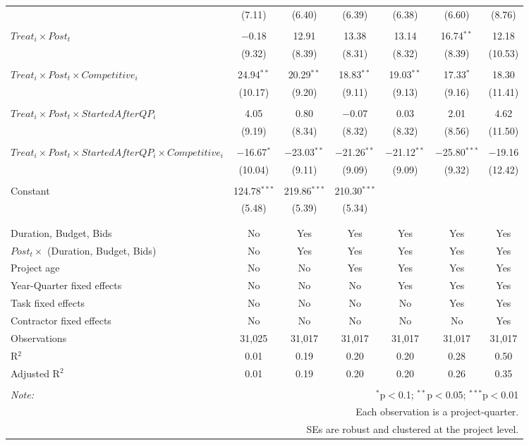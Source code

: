 \documentclass[
]{article}
\begin{document}
\begin{table}[H]
\begin{tabular}{@{\extracolsep{-3pt}}lcccccc}
  & (7.11) & (6.40) & (6.39) & (6.38) & (6.60) & (8.76) \\ 
  & & & & & & \\ 
 $Treat_i \times Post_t$ & $-$0.18 & 12.91 & 13.38 & 13.14 & 16.74$^{**}$ & 12.18 \\ 
  & (9.32) & (8.39) & (8.31) & (8.32) & (8.39) & (10.53) \\ 
  & & & & & & \\ 
 $Treat_i \times Post_t \times Competitive_i$ & 24.94$^{**}$ & 20.29$^{**}$ & 18.83$^{**}$ & 19.03$^{**}$ & 17.33$^{*}$ & 18.30 \\ 
  & (10.17) & (9.20) & (9.11) & (9.13) & (9.16) & (11.41) \\ 
  & & & & & & \\ 
 $Treat_i \times Post_t \times StartedAfterQP_i$ & 4.05 & 0.80 & $-$0.07 & 0.03 & 2.01 & 4.62 \\ 
  & (9.19) & (8.34) & (8.32) & (8.32) & (8.56) & (11.50) \\ 
  & & & & & & \\ 
 $Treat_i \times Post_t \times StartedAfterQP_i \times Competitive_i$ & $-$16.67$^{*}$ & $-$23.03$^{**}$ & $-$21.26$^{**}$ & $-$21.12$^{**}$ & $-$25.80$^{***}$ & $-$19.16 \\ 
  & (10.04) & (9.11) & (9.09) & (9.09) & (9.32) & (12.42) \\ 
  & & & & & & \\ 
 Constant & 124.78$^{***}$ & 219.86$^{***}$ & 210.30$^{***}$ &  &  &  \\ 
  & (5.48) & (5.39) & (5.34) &  &  &  \\ 
  & & & & & & \\ 
\hline \\[-1.8ex] 
Duration, Budget, Bids & No & Yes & Yes & Yes & Yes & Yes \\ 
$Post_t \times $  (Duration, Budget, Bids) & No & Yes & Yes & Yes & Yes & Yes \\ 
Project age & No & No & Yes & Yes & Yes & Yes \\ 
Year-Quarter fixed effects & No & No & No & Yes & Yes & Yes \\ 
Task fixed effects & No & No & No & No & Yes & Yes \\ 
Contractor fixed effects & No & No & No & No & No & Yes \\ 
Observations & 31,025 & 31,017 & 31,017 & 31,017 & 31,017 & 31,017 \\ 
R$^{2}$ & 0.01 & 0.19 & 0.20 & 0.20 & 0.28 & 0.50 \\ 
Adjusted R$^{2}$ & 0.01 & 0.19 & 0.20 & 0.20 & 0.26 & 0.35 \\ 
\hline 
\hline \\[-1.8ex] 
\textit{Note:}  & \multicolumn{6}{r}{$^{*}$p$<$0.1; $^{**}$p$<$0.05; $^{***}$p$<$0.01} \\ 
 & \multicolumn{6}{r}{Each observation is a project-quarter.} \\ 
 & \multicolumn{6}{r}{SEs are robust and clustered at the project level.} \\ 
\end{tabular} 
\end{table}
\end{document}
